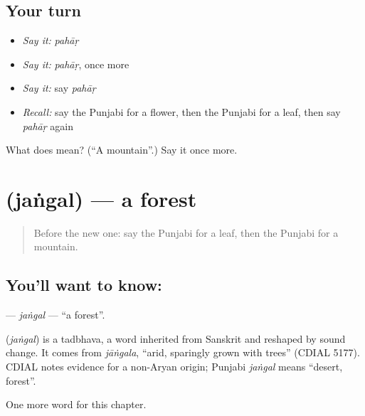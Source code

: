 \subsection*{Your turn}
\begin{itemize}
\raggedright
  \item \emph{Say it:} \emph{pahāṛ}
  \item \emph{Say it:} \emph{pahāṛ}, once more
  \item \emph{Say it:} say \emph{pahāṛ}
  \item \emph{Recall:} say the Punjabi for a flower, then the Punjabi for a leaf, then say \emph{pahāṛ} again
\end{itemize}

\begin{tcolorbox}[breakable,colback=teal!4,colframe=teal!35!black,title={Before you move on}]
What does  mean? (\textquotedblleft{}A mountain\textquotedblright{}.) Say it once more.
\end{tcolorbox}
\section[\texorpdfstring{\pa{ਜੰਗਲ} (jaṅgal)}{ਜੰਗਲ (jaṅgal)}]{ (jaṅgal) — a forest}

\label{lesson:PA-C74-jangal}



\begin{quote}
Before the new one: say the Punjabi for a leaf, then the Punjabi for a mountain.
\end{quote}

\subsection*{You'll want to know: }
\textbf{} — \emph{jaṅgal} — \textquotedblleft{}a forest\textquotedblright{}.

\begin{cousinweb}
\textbf{} (\emph{jaṅgal}) is a tadbhava, a word inherited from Sanskrit and reshaped by sound change. It comes from \emph{jāṅgala}, \textquotedblleft{}arid, sparingly grown with trees\textquotedblright{} (CDIAL 5177). CDIAL notes evidence for a non-Aryan origin; Punjabi \emph{jaṅgal} means \textquotedblleft{}desert, forest\textquotedblright{}.
\end{cousinweb}

\begin{grammarlens}[title={What you've built}]
One more word for this chapter.
\end{grammarlens}

